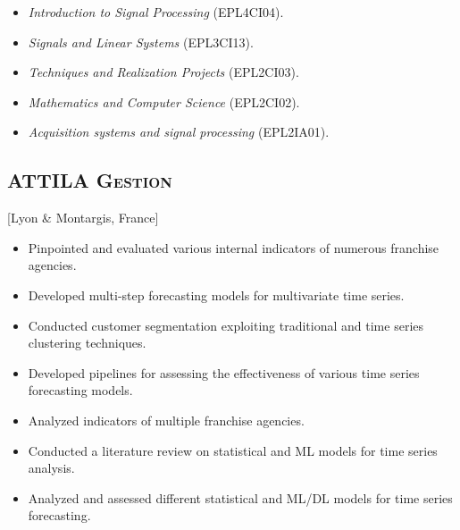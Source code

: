 \documentclass{mycv}
\begin{document}
\begin{positions}
\end{positions}

\begin{itemize}
  \itemsep 0em
  \item \textit{Introduction to Signal Processing} (EPL4CI04).
  \item \textit{Signals and Linear Systems} (EPL3CI13).
  \item \textit{Techniques and Realization Projects} (EPL2CI03).
  \item \textit{Mathematics and Computer Science} (EPL2CI02).
  \item \textit{Acquisition systems and signal processing} (EPL2IA01).
\end{itemize}

\subsection{\scshape ATTILA Gestion}[Lyon \& Montargis, France]

\begin{positions}
\end{positions}

\begin{itemize}
  \itemsep 0em
  \item Pinpointed and evaluated various internal indicators of numerous franchise agencies.
  \item Developed multi-step forecasting models for multivariate time series.
  \item Conducted customer segmentation exploiting traditional and time series clustering techniques.
  \item Developed pipelines for assessing the effectiveness of various time series forecasting models.
\end{itemize}

\begin{positions}
\end{positions}

\begin{itemize}
  \itemsep 0em
  \item Analyzed indicators of multiple franchise agencies.
  \item Conducted a literature review on statistical and ML models for time series analysis.
  \item Analyzed and assessed different statistical and ML/DL models for time series forecasting.
\end{itemize}
\end{document}

